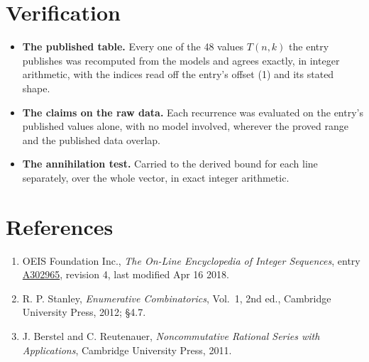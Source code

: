 \documentclass[11pt]{article}
\theoremstyle{definition}
\begin{document}
\section{Verification}

\begin{itemize}

\item {\bfseries The published table.} Every one of the 48 values $T(n,k)$ the entry publishes was recomputed from the models and agrees exactly, in integer arithmetic, with the indices read off the entry's offset (1) and its stated shape.

\item {\bfseries The claims on the raw data.} Each recurrence was evaluated on the entry's published values alone, with no model involved, wherever the proved range and the published data overlap.

\item {\bfseries The annihilation test.} Carried to the derived bound for each line separately, over the whole vector, in exact integer arithmetic.

\end{itemize}

\section{References}

\begin{enumerate}

\item OEIS Foundation Inc., \emph{The On-Line Encyclopedia of Integer Sequences}, entry \href{https://oeis.org/A302965}{A302965}, revision 4, last modified Apr 16 2018.

\item R. P. Stanley, \emph{Enumerative Combinatorics}, Vol.~1, 2nd ed., Cambridge University Press, 2012; \S4.7.

\item J. Berstel and C. Reutenauer, \emph{Noncommutative Rational Series with Applications}, Cambridge University Press, 2011.

\end{enumerate}
\end{document}
